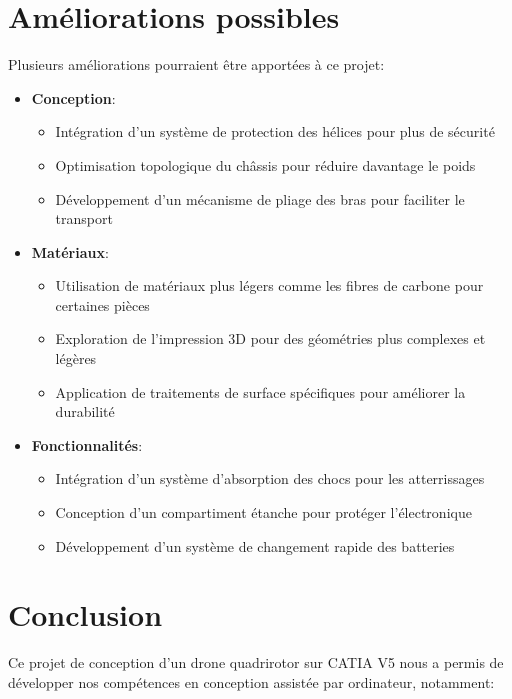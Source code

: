 \documentclass[a4paper,12pt]{report}
\begin{document}
\section{Améliorations possibles}
Plusieurs améliorations pourraient être apportées à ce projet:

\begin{itemize}
    \item \textbf{Conception}:
    \begin{itemize}
        \item Intégration d'un système de protection des hélices pour plus de sécurité
        \item Optimisation topologique du châssis pour réduire davantage le poids
        \item Développement d'un mécanisme de pliage des bras pour faciliter le transport
    \end{itemize}
    
    \item \textbf{Matériaux}:
    \begin{itemize}
        \item Utilisation de matériaux plus légers comme les fibres de carbone pour certaines pièces
        \item Exploration de l'impression 3D pour des géométries plus complexes et légères
        \item Application de traitements de surface spécifiques pour améliorer la durabilité
    \end{itemize}
    
    \item \textbf{Fonctionnalités}:
    \begin{itemize}
        \item Intégration d'un système d'absorption des chocs pour les atterrissages
        \item Conception d'un compartiment étanche pour protéger l'électronique
        \item Développement d'un système de changement rapide des batteries
    \end{itemize}
\end{itemize}

\section{Conclusion}
Ce projet de conception d'un drone quadrirotor sur CATIA V5 nous a permis de développer nos compétences en conception assistée par ordinateur, notamment:
\end{document}
